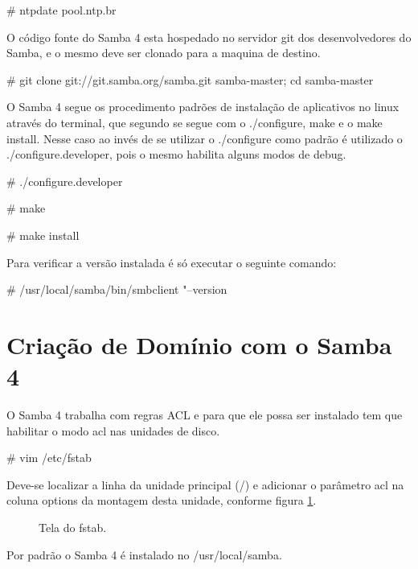 \# ntpdate pool.ntp.br

O código fonte do Samba 4 esta hospedado no servidor git dos desenvolvedores do Samba, e o mesmo deve ser clonado para a maquina de destino.

\# git clone git://git.samba.org/samba.git samba-master; cd samba-master

O Samba 4 segue os procedimento padrões de instalação de aplicativos no linux através do terminal, que segundo \cite{INSTALL} se segue com o ./configure, make e o make install. Nesse caso ao invés de se utilizar o ./configure como padrão é utilizado o ./configure.developer, pois o mesmo habilita alguns modos de debug.

\# ./configure.developer

\# make 

\# make install

Para verificar a versão instalada é só executar o seguinte comando:

\# /usr/local/samba/bin/smbclient "--version


\section{Criação de Domínio com o Samba 4}

O Samba 4 trabalha com regras ACL e para que ele possa ser instalado tem que habilitar o modo acl nas unidades de disco.

\# vim /etc/fstab

Deve-se localizar a linha da unidade principal (/) e adicionar o parâmetro acl na coluna options da montagem desta unidade, conforme figura \ref{fstab}.

\begin{figure}[ht]
   	\centering
   	\caption{Tela do fstab.}
    \label{fstab}
\end{figure}

Por padrão o Samba 4 é instalado no /usr/local/samba.

